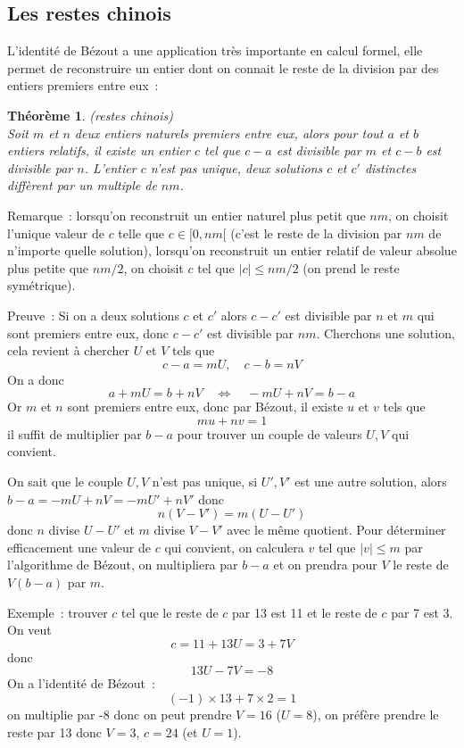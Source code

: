 \documentclass[a4paper,11pt]{book}
\newtheorem{thm}{Théorème}
\begin{document}
\begin{giacjshere}
\subsection{Les restes chinois}
L'identit\'e de B\'ezout a une application tr\`es importante en calcul
formel, elle permet de reconstruire un entier dont on connait le reste de la
division par des entiers premiers entre eux~:
\begin{thm} (restes chinois)\\
Soit $m$ et $n$ deux entiers naturels premiers entre eux, alors pour tout
$a$ et $b$ entiers relatifs, il existe un entier $c$ tel que $c-a$ est
divisible par $m$ et $c-b$ est divisible par $n$. 
L'entier $c$ n'est pas unique, deux solutions $c$ et $c'$ distinctes
diff\`erent par un multiple de $nm$. 
\end{thm}
Remarque~: lorsqu'on reconstruit un entier naturel plus petit que $nm$, on choisit
l'unique valeur de $c$ telle que $c \in [0,nm[$ (c'est le reste de la
division par $nm$ de n'importe quelle solution), lorsqu'on reconstruit un
entier relatif de valeur absolue plus petite que $nm/2$, 
on choisit $c$ tel que $|c|\leq nm/2$ (on prend le
reste sym\'etrique).
  
Preuve~: Si on a deux solutions $c$ et $c'$ alors $c-c'$ est divisible
par $n$ et $m$ qui sont premiers entre eux, donc $c-c'$ est divisible
par $nm$.
Cherchons une solution, cela revient \`a chercher $U$ et $V$ tels que
$$c-a=mU, \quad c-b= nV$$
On a donc
$$ a+mU=b+nV \quad \Leftrightarrow \quad -mU+nV=b-a$$
Or $m$ et $n$ sont premiers entre eux, donc par B\'ezout, il
existe $u$ et $v$ tels que
$$mu+nv=1$$
il suffit de multiplier par $b-a$ pour trouver un couple de valeurs
$U,V$ qui convient.

On sait que le couple $U,V$ n'est pas unique, si $U',V'$ est
une autre solution, alors $b-a=-mU+nV=-mU'+nV'$ donc
$$n(V-V')=m(U-U')$$
donc $n$ divise $U-U'$ et $m$ divise $V-V'$ avec le m\^eme quotient.
Pour d\'eterminer efficacement une valeur de $c$ qui convient,
on calculera $v$ tel que $|v|\leq m$ par l'algorithme de B\'ezout, 
on multipliera par $b-a$ et on prendra pour $V$ le reste
de $V(b-a)$ par $m$.

Exemple~: trouver $c$ tel que le reste de $c$ par 13 est 11 et le reste
de $c$ par 7 est 3. On veut 
$$ c=11+13U=3+7V $$
donc
$$ 13U-7V=-8$$
On a l'identit\'e de B\'ezout~:
$$ (-1)\times 13 + 7\times2 = 1$$
on multiplie par -8 donc on peut prendre $V=16$ ($U=8$), on 
pr\'ef\`ere prendre
le reste par 13 donc $V=3$, $c=24$ (et $U=1$).


\end{giacjshere}
\end{document}
